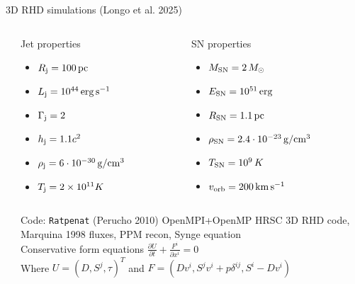 \begin{frame}{3D RHD simulations (Longo et al. 2025)}
\begin{columns}
{\begin{column}{0.5\textwidth}
		\end{column}}
		\begin{column}{0.7\textwidth}
			{\scriptsize
		 \begin{columns}\begin{column}{.5\textwidth}
		  \begin{alertblock}{Jet properties}
			\begin{itemize}
		      \item $R_{\rm j} = 100\,{\rm pc}$
			  \item $L_{\rm j} = 10^{44}\,{\rm erg}\,{\rm s}^{-1}$
			  \item $\Gamma_{\rm j}=2$
			  \item $h_{\rm j} = 1.1c^{2}$
			  \item $\rho_{\rm j} = 6\cdot10^{-30}\,{\rm g}/{\rm cm}^{3}$
			  \item $T_{\rm j} = 2\times 10^{11} K$
			\end{itemize}
		   \end{alertblock}
		  \end{column}
		  \hspace{-2cm}
		  \begin{column}{.5\textwidth}
		   \begin{exampleblock}{SN properties}
		     \begin{itemize}
					\item $M_{\rm SN}=2\,M_\odot$
					\item $E_{\rm SN}=10^{51}\,{\rm erg}$
					\item $R_{\rm SN}=1.1\,{\rm pc}$
					\item $\rho_{\rm SN}= 2.4\cdot10^{-23}\,{\rm g}/{\rm cm}^{3}$
					\item $T_{\rm SN} = 10^{9}\,K$
					\item $v_{\rm orb} = 200\,{\rm km}\,{\rm s}^{-1}$
				\end{itemize}
			\end{exampleblock}
		 \end{column}
		\end{columns}}
		\vspace{1cm}
		{\scriptsize
		\begin{block}{Code: \texttt{Ratpenat} (Perucho 2010)}
			OpenMPI+OpenMP HRSC 3D RHD code, Marquina 1998 fluxes, PPM recon, Synge equation
			\\
				Conservative form equations $\frac{\partial U}{\partial t}+\frac{F^{i}}{\partial x^{i}}=0$\\
				Where $U=(D,S^{j},\tau)^{T}$ and $F = (Dv^{i}, S^{j}v^{i}+p\delta^{ij}, S^{i}-Dv^{i}) $
		\end{block}
			}
		\end{column}
	\end{columns}
\end{frame}
